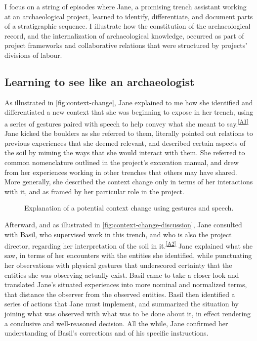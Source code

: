 I focus on a string of episodes where Jane, a promising trench assistant working at an archaeological project, learned to identify, differentiate, and document parts of a stratigraphic sequence.
I illustrate how the constitution of the archaeological record, and the internalization of archaeological knowledge, occurred as part of project frameworks and collaborative relations that were structured by projects' divisions of labour.

\subsection*{Learning to see like an archaeologist}
As illustrated in \autoref{fig:context-change}, Jane explained to me how she identified and differentiated a new context that she was beginning to expose in her trench, using a series of gestures paired with speech to help convey what she meant to say.\textsuperscript{\ref{A1}}
Jane kicked the boulders as she referred to them, literally pointed out relations to previous experiences that she deemed relevant, and described certain aspects of the soil by miming the ways that she would interact with them.
She referred to common nomenclature outlined in the project's excavation manual, and drew from her experiences working in other trenches that others may have shared.
More generally, she described the context change only in terms of her interactions with it, and as framed by her particular role in the project.

\begin{sidewaysfigure}
\centering
\setlength{\fboxsep}{1pt}
\setlength{\fboxrule}{1pt}
\caption[Explanation of a potential context change using gestures and speech.]{Explanation of a potential context change using gestures and speech.}
\label{fig:context-change}
\end{sidewaysfigure}

Afterward, and as illustrated in \autoref{fig:context-change-discussion}, Jane consulted with Basil, who supervised work in this trench, and who is also the project director, regarding her interpretation of the soil in it.\textsuperscript{\ref{A2}}
Jane explained what she saw, in terms of her encounters with the entities she identified, while punctuating her observations with physical gestures that underscored certainty that the entities she was observing actually exist.
Basil came to take a closer look and translated Jane's situated experiences into more nominal and normalized terms, that distance the observer from the observed entities.
Basil then identified a series of actions that Jane must implement, and summarized the situation by joining what was observed with what was to be done about it, in effect rendering a conclusive and well-reasoned decision.
All the while, Jane confirmed her understanding of Basil's corrections and of his specific instructions.

